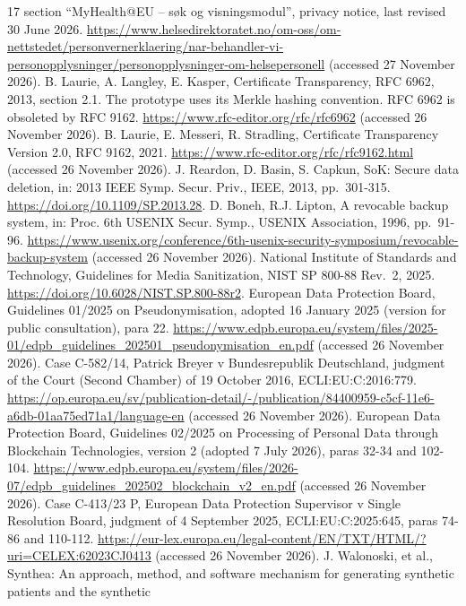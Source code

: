 \documentclass[preprint,review,12pt]{elsarticle}
\begin{document}
\begin{thebibliography}{17}
section ``MyHealth@EU -- søk og visningsmodul'', privacy notice, last
revised 30 June 2026.
\url{https://www.helsedirektoratet.no/om-oss/om-nettstedet/personvernerklaering/nar-behandler-vi-personopplysninger/personopplysninger-om-helsepersonell}
(accessed 27 November 2026).
 B. Laurie, A. Langley, E. Kasper, Certificate Transparency, RFC
6962, 2013, section 2.1. The prototype uses its Merkle hashing
convention. RFC 6962 is obsoleted by RFC 9162.
\url{https://www.rfc-editor.org/rfc/rfc6962} (accessed 26 November
2026).
 B. Laurie, E. Messeri, R. Stradling, Certificate Transparency
Version 2.0, RFC 9162, 2021.
\url{https://www.rfc-editor.org/rfc/rfc9162.html} (accessed 26 November
2026).
 J. Reardon, D. Basin, S. Capkun, SoK: Secure data deletion, in:
2013 IEEE Symp. Secur. Priv., IEEE, 2013, pp.~301-315.
\url{https://doi.org/10.1109/SP.2013.28}.
 D. Boneh, R.J. Lipton, A revocable backup system, in: Proc. 6th
USENIX Secur. Symp., USENIX Association, 1996, pp.~91-96.
\url{https://www.usenix.org/conference/6th-usenix-security-symposium/revocable-backup-system}
(accessed 26 November 2026).
 National Institute of Standards and Technology, Guidelines for
Media Sanitization, NIST SP 800-88 Rev.~2, 2025.
\url{https://doi.org/10.6028/NIST.SP.800-88r2}.
 European Data Protection Board, Guidelines 01/2025 on
Pseudonymisation, adopted 16 January 2025 (version for public
consultation), para 22.
\url{https://www.edpb.europa.eu/system/files/2025-01/edpb_guidelines_202501_pseudonymisation_en.pdf}
(accessed 26 November 2026).
 Case C-582/14, Patrick Breyer v Bundesrepublik Deutschland,
judgment of the Court (Second Chamber) of 19 October 2016,
ECLI:EU:C:2016:779.
\url{https://op.europa.eu/sv/publication-detail/-/publication/84400959-c5cf-11e6-a6db-01aa75ed71a1/language-en}
(accessed 26 November 2026).
 European Data Protection Board, Guidelines 02/2025 on
Processing of Personal Data through Blockchain Technologies, version 2
(adopted 7 July 2026), paras 32-34 and 102-104.
\url{https://www.edpb.europa.eu/system/files/2026-07/edpb_guidelines_202502_blockchain_v2_en.pdf}
(accessed 26 November 2026).
 Case C-413/23 P, European Data Protection Supervisor v Single
Resolution Board, judgment of 4 September 2025, ECLI:EU:C:2025:645,
paras 74-86 and 110-112.
\url{https://eur-lex.europa.eu/legal-content/EN/TXT/HTML/?uri=CELEX:62023CJ0413}
(accessed 26 November 2026).
 J. Walonoski, et al., Synthea: An approach, method, and
software mechanism for generating synthetic patients and the synthetic

\end{thebibliography}
\end{document}
